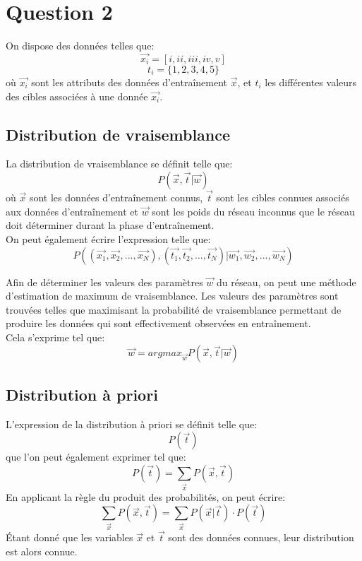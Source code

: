 \section{Question 2}
On dispose des données telles que:
$$ \overrightarrow{x_i} = [i, ii, iii, iv, v] $$
$$ t_i = \{1, 2, 3, 4, 5\} $$ 
où $\overrightarrow{x_i}$ sont les attributs des données d'entraînement $\overrightarrow{x}$, et $t_i$ les différentes valeurs des cibles associées à une donnée $\overrightarrow{x_i}$.

\subsection{Distribution de vraisemblance}
La distribution de vraisemblance se définit telle que: 
$$ P(\overrightarrow{x}, \overrightarrow{t} | \overrightarrow{w}) $$
où $\overrightarrow{x}$ sont les données d'entraînement connus, $\overrightarrow{t}$ sont les cibles connues associés aux données d'entraînement et  $\overrightarrow{w}$ sont les poids du réseau inconnus que le réseau doit déterminer durant la phase d'entraînement. \\
On peut également écrire l'expression telle que:
$$ P((\overrightarrow{x_1}, \overrightarrow{x_2}, ..., \overrightarrow{x_N}), (\overrightarrow{t_1}, \overrightarrow{t_2}, ..., \overrightarrow{t_N}) | \overrightarrow{w_1}, \overrightarrow{w_2}, ..., \overrightarrow{w_N}) $$ 

Afin de déterminer les valeurs des paramètres $\overrightarrow{w}$ du réseau, on peut une méthode d'estimation de maximum de vraisemblance. Les valeurs des paramètres sont trouvées telles que maximisant la probabilité de vraisemblance permettant de produire les données qui sont effectivement observées en entraînement. \\
Cela s'exprime tel que:
$$ \overrightarrow{w} = argmax_{\overrightarrow{w}} P(\overrightarrow{x}, \overrightarrow{t} | \overrightarrow{w}) $$

\subsection{Distribution à priori}
L'expression de la distribution à priori se définit telle que:
$$ P(\overrightarrow{t})  $$
que l'on peut également exprimer tel que:
$$ P(\overrightarrow{t})  = \sum_{\overrightarrow{x}} P(\overrightarrow{x}, \overrightarrow{t}) $$
En applicant la règle du produit des probabilités, on peut écrire:
$$ \sum_{\overrightarrow{x}} P(\overrightarrow{x}, \overrightarrow{t}) =  \sum_{\overrightarrow{x}} P(\overrightarrow{x} | \overrightarrow{t}) \cdot P( \overrightarrow{t})$$
Étant donné que les variables $\overrightarrow{x}$ et $\overrightarrow{t}$ sont des données connues, leur distribution est alors connue. 

